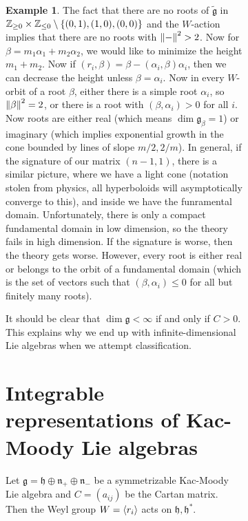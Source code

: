 \documentclass[leqno, openany]{memoir}
\theoremstyle{definition}
\newtheorem{exm}[thm]{Example}
\theoremstyle{remark}
\theoremstyle{plain}
\theoremstyle{definition}
\theoremstyle{remark}
\newcommand{\Z}{\mathbb{Z}}
\newcommand{\mf}[1]{\mathfrak{#1}}
\newcommand{\wtl}[1]{\widetilde{#1}}
\begin{document}
\begin{figure}[H]
\begin{figure}[H]
\begin{exm}
    The fact that there are no roots of $\wtl{\mf{g}}$ in $\Z_{\geq 0} \times
\Z_{\leq 0} \setminus \qty{(0,1), (1,0), (0,0)}$ and the $W$-action implies
that there are no roots with $\norm{-}^2 > 2$. Now for $\beta = m_1 \alpha_1 +
m_2 \alpha_2$, we would like to minimize the height $m_1 + m_2$. Now if $(r_i,
\beta) = \beta - (\alpha_i, \beta) \alpha_i$, then we can decrease the height
unless $\beta = \alpha_i$. Now in every $W$-orbit of a root $\beta$, either
there is a simple root $\alpha_i$, so $\norm{\beta}^2 = 2$, or there is a root
with $(\beta, \alpha_i) > 0$ for all $i$. Now roots are either real (which
means $\dim \mf{g}_{\beta} = 1$) or imaginary (which implies exponential growth
in the cone bounded by lines of slope $m/2, 2/m$). In general, if the signature
of our matrix $(n-1,1)$, there is a similar picture, where we have a light cone
(notation stolen from physics, all hyperboloids will asymptotically converge to
this), and inside we have the funramental domain. Unfortunately, there is only
a compact fundamental domain in low dimension, so the theory fails in high
dimension. If the signature is worse, then the theory gets worse. However,
every root is either real or belongs to the orbit of a fundamental domain
(which is the set of vectors such that $(\beta, \alpha_i) \leq 0$ for all but
finitely many roots).  \end{exm}

It should be clear that $\dim \mf{g} < \infty$ if and only if $C > 0$. This
explains why we end up with infinite-dimensional Lie algebras when we attempt
classification.

\section{Integrable representations of Kac-Moody Lie algebras}%
\label{sec:integrable_representations_of_kac_moody_lie_algebras}

Let $\mf{g} = \mf{h} \oplus \mf{n}_+ \oplus \mf{n}_-$ be a symmetrizable
Kac-Moody Lie algebra and $C = (a_{ij})$ be the Cartan matrix. Then the Weyl
group $W = \ev{r_i}$ acts on $\mf{h}, \mf{h}^*$.


\end{figure}
\end{figure}
\end{document}
